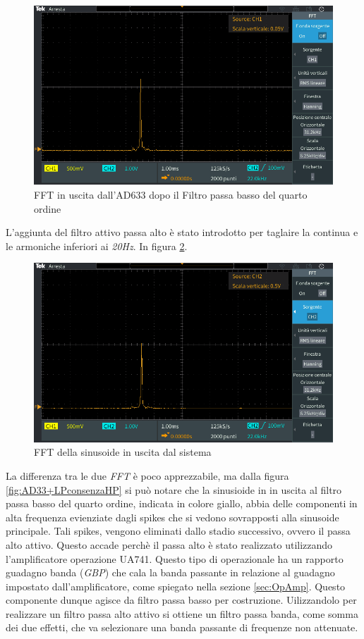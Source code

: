 \documentclass[titlepage]{report}
\begin{document}
	\begin{figure}[H]
		\centering
		\includegraphics[scale = 0.5]{Immagini/fft_ad633+lp4.PNG}
		\caption{FFT in uscita dall'AD633 dopo il Filtro passa basso del quarto ordine}
		\label{fig:FFTAD33+LP4}
	\end{figure}

	L'aggiunta del filtro attivo passa alto è stato introdotto per taglaire la continua e le armoniche inferiori ai \textit{20Hz}.
	In figura \ref{fig:FFTfinale}.


	\begin{figure}[H]
		\centering
		\includegraphics[scale = 0.5]{Immagini/ftt_ad633+lp4+hp1_final.PNG}
		\caption{FFT della sinusoide in uscita dal sistema}
		\label{fig:FFTfinale}
	\end{figure}


	 La differenza tra le due \textit{FFT} è poco apprezzabile, ma dalla figura \ref{fig:AD33+LPconsenzaHP} si può notare che la sinusioide in in uscita al filtro passa basso del quarto ordine, indicata in colore giallo, abbia delle componenti in alta frequenza evienziate dagli spikes che si vedono sovrapposti alla sinusoide principale. Tali spikes, vengono eliminati dallo stadio successivo, ovvero il passa alto attivo. Questo accade perchè il passa alto è stato realizzato utilizzando l'amplificatore operazione UA741. Questo tipo di operazionale ha un rapporto guadagno banda (\textit{GBP}) che cala la banda passante in relazione al guadagno impostato dall'amplificatore, come spiegato nella sezione \ref{sec:OpAmp}. Questo componente dunque agisce da filtro passa basso per costruzione. Uilizzandolo per realizzare un filtro passa alto attivo si ottiene un filtro passa banda, come somma dei due effetti, che va selezionare una banda passante di frequenze non attenuate.
	 
\end{document}

